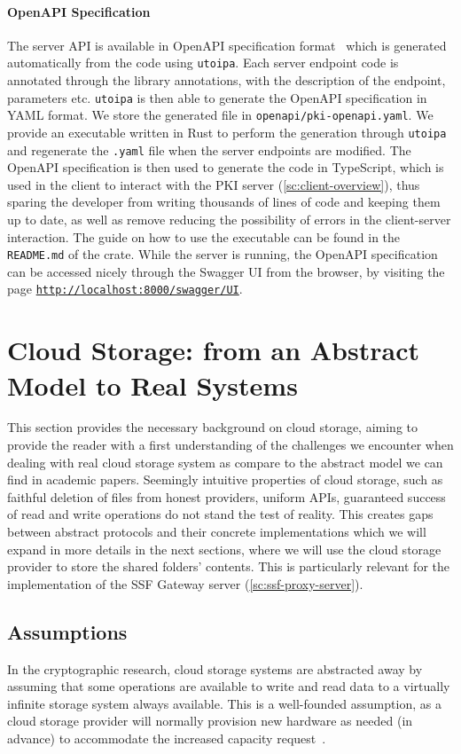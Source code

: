 \paragraph{OpenAPI Specification}
The server API is available in OpenAPI
specification format~\cite{OpenAPISurvey} 
which is generated automatically from the code using
\texttt{utoipa}. Each server endpoint code is
annotated through the library annotations, with the description
of the endpoint, parameters etc. \texttt{utoipa} is then
able to generate the OpenAPI specification in YAML format.
We store the generated file in \texttt{openapi/pki-openapi.yaml}.
We provide an executable written in Rust to perform the generation
through \texttt{utoipa} and regenerate the \texttt{.yaml}
file when the server endpoints are modified.
The OpenAPI specification is then used to generate the
code in TypeScript, which is used in the client to interact
with the PKI server (\cref{sc:client-overview}), thus sparing
the developer from writing thousands of lines of code and keeping them up to date, 
as well as remove reducing the possibility of errors in the client-server interaction. 
The guide on how to use the executable can be found in the \texttt{README.md}
of the crate.
While the server is running, the OpenAPI specification can be
accessed nicely through the Swagger UI from the browser, 
by visiting the page \texttt{\url{http://localhost:8000/swagger/UI}}.

\section{Cloud Storage: from an Abstract Model to Real Systems}\label{sc:cloud-storage}

This section provides the necessary background on cloud storage,
aiming to provide the reader with a first understanding of the challenges
we encounter when dealing with real cloud storage system
as compare to the abstract model we can find in academic papers.
Seemingly intuitive properties of cloud storage, such as faithful deletion of files from honest
providers, uniform APIs, guaranteed success of read and write operations do not stand the test
of reality.
This creates gaps between abstract protocols and their concrete implementations
which we will expand in more details in the next sections,
where we will use the cloud storage provider to store the shared folders' contents.
This is particularly relevant for the implementation of the
SSF Gateway server (\cref{sc:ssf-proxy-server}).

\subsection{Assumptions}\label{scc:cloud-storage-assumptions}
In the cryptographic research, cloud storage systems are abstracted away by assuming
that some operations are available to write and read data to a virtually
infinite storage system always available.
This is a well-founded assumption, as a cloud storage provider
will normally provision new hardware as needed (in advance) to accommodate the
increased capacity request~\cite{AzureBlobStorage}.

